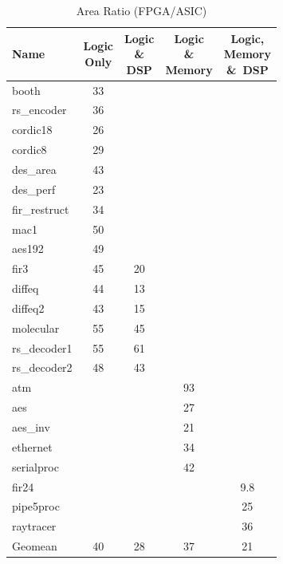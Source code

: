 \begin{table}[htbp]
\centering
\caption{Area Ratio (FPGA/ASIC)}
\label{tab:area-ratio}
\begin{tabular}{lcccc}
\toprule
Name & \shortstack{Logic\\Only} & \shortstack{Logic\\\&\\DSP} & \shortstack{Logic\\\&\\Memory} & \shortstack{Logic,\\Memory\\\&\ DSP} \\
\midrule
booth        & 33 &    &    &     \\
rs\_encoder  & 36 &    &    &     \\
cordic18     & 26 &    &    &     \\
cordic8      & 29 &    &    &     \\
des\_area    & 43 &    &    &     \\
des\_perf    & 23 &    &    &     \\
fir\_restruct& 34 &    &    &     \\
mac1         & 50 &    &    &     \\
aes192       & 49 &    &    &     \\
fir3         & 45 & 20 &    &     \\
diffeq       & 44 & 13 &    &     \\
diffeq2      & 43 & 15 &    &     \\
molecular    & 55 & 45 &    &     \\
rs\_decoder1 & 55 & 61 &    &     \\
rs\_decoder2 & 48 & 43 &    &     \\
atm          &    &    & 93 &     \\
aes          &    &    & 27 &     \\
aes\_inv     &    &    & 21 &     \\
ethernet     &    &    & 34 &     \\
serialproc   &    &    & 42 &     \\
fir24        &    &    &    & 9.8 \\
pipe5proc    &    &    &    & 25  \\
raytracer    &    &    &    & 36  \\
\midrule
Geomean      & 40 & 28 & 37 & 21  \\
\bottomrule
\end{tabular}
\end{table}

